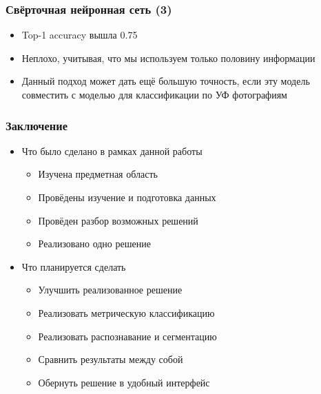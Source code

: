 \documentclass[xetex,mathserif,serif]{beamer}
\begin{document}
	
	\begin{frame}
		\frametitle{Свёрточная нейронная сеть (3)}
		
        \begin{itemize}
            \item Top-1 accuracy вышла 0.75
            \item Неплохо, учитывая, что мы используем только половину информации
            \item Данный подход может дать ещё большую точность, если эту модель совместить с моделью для классификации по УФ фотографиям
        \end{itemize}    
        
	\end{frame}	
	
	
	\begin{frame}
		\frametitle{Заключение}
		
        \begin{itemize}
            \item Что было сделано в рамках данной работы
                \begin{itemize}
                    \item Изучена предметная область
                    \item Провёдены изучение и подготовка данных
                    \item Провёден разбор возможных решений
                    \item Реализовано одно решение 
                \end{itemize}
            \item Что планируется сделать
                \begin{itemize}
                    \item Улучшить реализованное решение
                    \item Реализовать метрическую классификацию
                    \item Реализовать распознавание и сегментацию
                    \item Сравнить результаты между собой
                    \item Обернуть решение в удобный интерфейс
                \end{itemize}  
        \end{itemize}    
        
	\end{frame}		
	 
\end{document}
